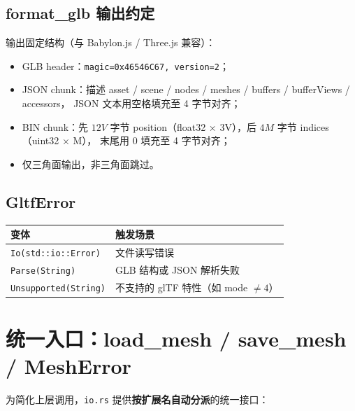 \documentclass[11pt,a4paper]{article}
\begin{document}
\subsection{format\_glb 输出约定}

输出固定结构（与 Babylon.js / Three.js 兼容）：
\begin{itemize}
  \item GLB header：\texttt{magic=0x46546C67, version=2}；
  \item JSON chunk：描述 asset / scene / nodes / meshes / buffers / bufferViews / accessors，
        JSON 文本用空格填充至 4 字节对齐；
  \item BIN chunk：先 $12V$ 字节 position（float32 × 3V），后 $4M$ 字节 indices（uint32 × M），
        末尾用 0 填充至 4 字节对齐；
  \item 仅三角面输出，非三角面跳过。
\end{itemize}

\subsection{GltfError}

\begin{center}
\renewcommand{\arraystretch}{1.18}
\begin{tabular}{@{}ll@{}}
  \toprule
  \textbf{变体} & \textbf{触发场景} \\
  \midrule
  \texttt{Io(std::io::Error)}     & 文件读写错误 \\
  \texttt{Parse(String)}          & GLB 结构或 JSON 解析失败 \\
  \texttt{Unsupported(String)}    & 不支持的 glTF 特性（如 mode $\ne 4$） \\
  \bottomrule
\end{tabular}
\end{center}

\section{统一入口：load\_mesh / save\_mesh / MeshError}

为简化上层调用，\texttt{io.rs} 提供\textbf{按扩展名自动分派}的统一接口：
\end{document}
